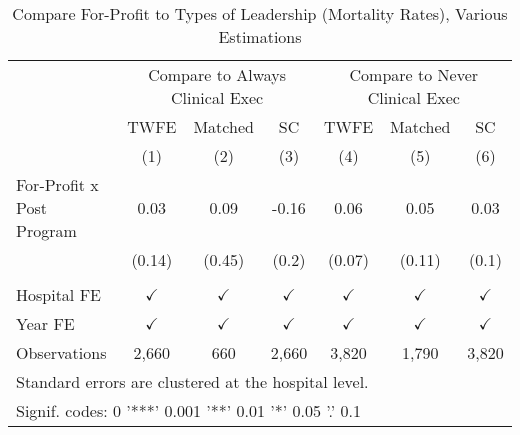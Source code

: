 \begin{table}[ht!]

\caption{\label{tab:forprofit_mort_estimators}Compare For-Profit to Types of Leadership (Mortality Rates), Various Estimations}
\centering
\begin{tabular}[t]{lcccccc}
\toprule
\multicolumn{1}{c}{ } & \multicolumn{3}{c}{Compare to Always Clinical Exec} & \multicolumn{3}{c}{Compare to Never Clinical Exec} \\
\cmidrule(l{3pt}r{3pt}){2-4} \cmidrule(l{3pt}r{3pt}){5-7}
\multicolumn{1}{c}{ } & \multicolumn{1}{c}{TWFE} & \multicolumn{1}{c}{Matched} & \multicolumn{1}{c}{SC} & \multicolumn{1}{c}{TWFE} & \multicolumn{1}{c}{Matched} & \multicolumn{1}{c}{SC} \\
\cmidrule(l{3pt}r{3pt}){2-2} \cmidrule(l{3pt}r{3pt}){3-3} \cmidrule(l{3pt}r{3pt}){4-4} \cmidrule(l{3pt}r{3pt}){5-5} \cmidrule(l{3pt}r{3pt}){6-6} \cmidrule(l{3pt}r{3pt}){7-7}
 & (1) & (2) & (3) & (4) & (5) & (6)\\
\midrule
For-Profit x Post Program & 0.03 & 0.09 & -0.16 & 0.06 & 0.05 & 0.03\\
 & (0.14) & (0.45) & (0.2) & (0.07) & (0.11) & (0.1)\\
 &  &  &  &  &  & \\
Hospital FE & $\checkmark$ & $\checkmark$ & $\checkmark$ & $\checkmark$ & $\checkmark$ & $\checkmark$\\
Year FE & $\checkmark$ & $\checkmark$ & $\checkmark$ & $\checkmark$ & $\checkmark$ & $\checkmark$\\
\addlinespace
Observations & 2,660 & 660 & 2,660 & 3,820 & 1,790 & 3,820\\
\bottomrule
\multicolumn{7}{l}{\textsuperscript{} Standard errors are clustered at the hospital level.}\\
\multicolumn{7}{l}{\textsuperscript{} Signif. codes: 0 '***' 0.001 '**' 0.01 '*' 0.05 '.' 0.1}\\
\end{tabular}
\end{table}
